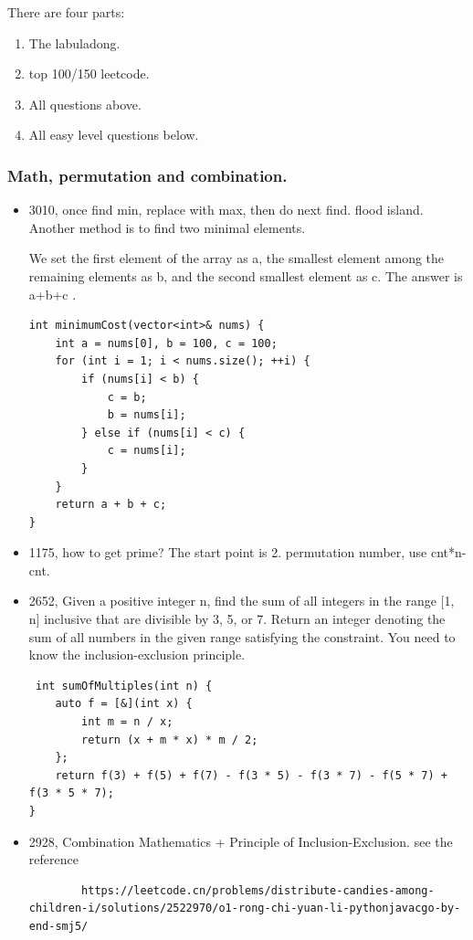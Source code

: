 \documentclass[a4paper,11pt,twoside]{book}
\begin{document}
There are four parts: 
\begin{enumerate}
	\item The labuladong.
	\item top 100/150 leetcode. 
	\item All questions above.
	\item All easy level questions below. 
\end{enumerate}


\subsubsection{Math, permutation and combination.}
\begin{itemize}
	
		\item 3010, once find min, replace with max, then do next find. flood island. Another method is to find two minimal elements. 
		
We set the first element of the array as a, the smallest element among the remaining elements as  b, and the second smallest element as c. The answer is a+b+c .
\begin{lstlisting}
int minimumCost(vector<int>& nums) {
	int a = nums[0], b = 100, c = 100;
	for (int i = 1; i < nums.size(); ++i) {
		if (nums[i] < b) {
			c = b;
			b = nums[i];
		} else if (nums[i] < c) {
			c = nums[i];
		}
	}
	return a + b + c;
}	
\end{lstlisting}	
	
	
	\item 1175, how to get prime? The start point is 2. permutation number, use cnt*n-cnt. 
	
	
	\item 2652, Given a positive integer n, find the sum of all integers in the range [1, n] inclusive that are divisible by 3, 5, or 7. Return an integer denoting the sum of all numbers in the given range satisfying the constraint. You need to know the inclusion-exclusion principle. 
	
\begin{lstlisting}
 int sumOfMultiples(int n) {
	auto f = [&](int x) {
		int m = n / x;
		return (x + m * x) * m / 2;
	};
	return f(3) + f(5) + f(7) - f(3 * 5) - f(3 * 7) - f(5 * 7) + f(3 * 5 * 7);
}
\end{lstlisting}
	
	\item 2928, Combination Mathematics + Principle of Inclusion-Exclusion. see the reference 
	
	\begin{lstlisting}
		https://leetcode.cn/problems/distribute-candies-among-children-i/solutions/2522970/o1-rong-chi-yuan-li-pythonjavacgo-by-end-smj5/
		

\end{lstlisting}
\end{itemize}
\end{document}
